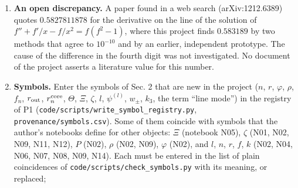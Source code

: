 \documentclass[
  10pt,
]{article}
\providecommand{\tightlist}{%
  \setlength{\itemsep}{0pt}\setlength{\parskip}{0pt}}
\begin{document}
\begin{enumerate}
  \begin{enumerate}
  \def\labelenumii{(\alph{enumii})}
  \tightlist
  \item
    the drafts say that the line modes with \(P=+1\) form doublets of
    \(SU(2)_A\) and those with \(P=-1\) doublets of \(SU(2)_B\); which
    of the two groups acts on which sign of \(P\) depends on how the
    existing documents name the two groups, and this was not checked;
  \item
    the value \(1.46\) in the energy
    \(\propto\ln(1.46\,r_{\rm out}/\text{healing
    length})\) of the vortex in a dilute Bose gas, quoted from the
    literature, and the bibliographic data of the five new references
    (Weinberg 1981; Ginzburg and Pitaevskii 1958; Gross 1961; Pitaevskii
    1961; Fetter 2009) were taken from web searches and have not been
    checked against the publications; the statement of the check
    \texttt{VX-P1c} of the program quotes the same value;
  \item
    the drafts fix the sign in Eq. (9) to \(+\); every earlier statement
    about \(P\) in Supplements S1 and S4 and in the manuscripts defines
    \(P\) only up to its sign and must be read again for consistency
    with this choice.
  \end{enumerate}
\item
  \textbf{An open discrepancy.} A paper found in a web search
  (arXiv:1212.6389) quotes \(0.5827811878\) for the derivative on the
  line of the solution of \(f''+f'/x-f/x^2=f(f^2-1)\), where this
  project finds \(0.583189\) by two methods that agree to \(10^{-10}\)
  and by an earlier, independent prototype. The cause of the difference
  in the fourth digit was not investigated. No document of the project
  asserts a literature value for this number.
\item
  \textbf{Symbols.} Enter the symbols of Sec. 2 that are new in the
  project (\(n\), \(r\), \(\varphi\), \(\rho\), \(f_n\),
  \(r_{\rm out}\), \(r^{\rm core}_n\), \(\Theta\), \(\Xi\), \(\zeta\),
  \(l\), \(\psi^{(l)}\), \(w_\pm\), \(k_3\), the term ``line mode'') in
  the registry of P1 (\texttt{code/scripts/write\_symbol\_registry.py},
  \texttt{provenance/symbols.csv}). Some of them coincide with symbols
  that the author's notebooks define for other objects: \(\Xi\)
  (notebook N05), \(\zeta\) (N01, N02, N09, N11, N12), \(P\) (N02),
  \(\rho\) (N02, N09), \(\varphi\) (N02), and \(l\), \(n\), \(r\),
  \(f\), \(k\) (N02, N04, N06, N07, N08, N09, N14). Each must be entered
  in the list of plain coincidences of
  \texttt{code/scripts/check\_symbols.py} with its meaning, or replaced;

\end{enumerate}
\end{document}

